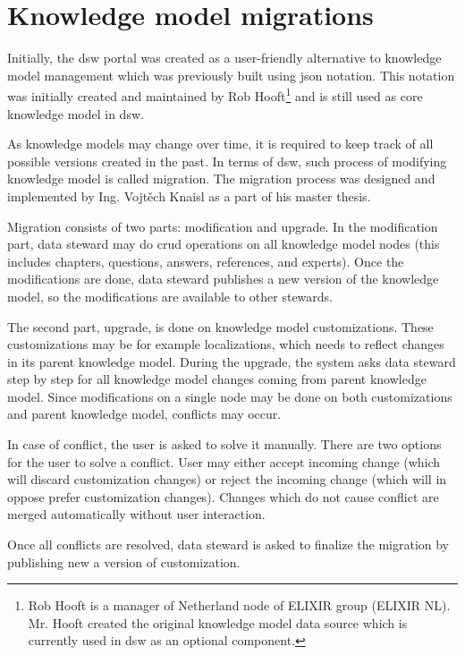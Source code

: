 \section{Knowledge model migrations}\label{sec:km-migrations}

Initially, the \gls{dsw} portal was created as a user-friendly alternative to knowledge model management which was previously built using \gls{json} notation.
This notation was initially created and maintained by Rob Hooft\footnote{Rob Hooft is a manager of Netherland node of ELIXIR group (ELIXIR NL). Mr. Hooft created the original knowledge model data source which is currently used in \gls{dsw} as an optional component.} and is still used as core knowledge model in \gls{dsw}.

As knowledge models may change over time, it is required to keep track of all possible versions created in the past.
In terms of \gls{dsw}, such process of modifying knowledge model is called migration.
The migration process was designed and implemented by Ing. Vojtěch Knaisl as a part of his master thesis\cite{mt-knaisl}.

Migration consists of two parts: modification and upgrade.
In the modification part, data steward may do \gls{crud} operations on all knowledge model nodes (this includes chapters, questions, answers, references, and experts).
Once the modifications are done, data steward publishes a new version of the knowledge model, so the modifications are available to other stewards.

The second part, upgrade, is done on knowledge model customizations.
These customizations may be for example localizations, which needs to reflect changes in its parent knowledge model.
During the upgrade, the system asks data steward step by step for all knowledge model changes coming from parent knowledge model.
Since modifications on a single node may be done on both customizations and parent knowledge model, conflicts may occur.

In case of conflict, the user is asked to solve it manually.
There are two options for the user to solve a conflict.
User may either accept incoming change (which will discard customization changes) or reject the incoming change (which will in oppose prefer customization changes).
Changes which do not cause conflict are merged automatically without user interaction.

Once all conflicts are resolved, data steward is asked to finalize the migration by publishing new a version of customization.

